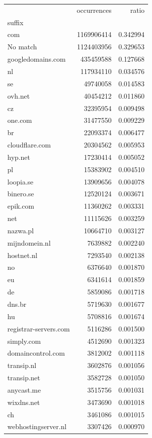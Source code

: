 \begin{tabular}{lrr}
\toprule
 & occurrences & ratio \\
suffix &  &  \\
\midrule
com & 1169906414 & 0.342994 \\
No match & 1124403956 & 0.329653 \\
googledomains.com & 435459588 & 0.127668 \\
nl & 117934110 & 0.034576 \\
se & 49740058 & 0.014583 \\
ovh.net & 40454212 & 0.011860 \\
cz & 32395954 & 0.009498 \\
one.com & 31477550 & 0.009229 \\
br & 22093374 & 0.006477 \\
cloudflare.com & 20304562 & 0.005953 \\
hyp.net & 17230414 & 0.005052 \\
pl & 15383902 & 0.004510 \\
loopia.se & 13909656 & 0.004078 \\
binero.se & 12520124 & 0.003671 \\
epik.com & 11360262 & 0.003331 \\
net & 11115626 & 0.003259 \\
nazwa.pl & 10664710 & 0.003127 \\
mijndomein.nl & 7639882 & 0.002240 \\
hostnet.nl & 7293540 & 0.002138 \\
no & 6376640 & 0.001870 \\
eu & 6341614 & 0.001859 \\
de & 5859086 & 0.001718 \\
dns.br & 5719630 & 0.001677 \\
hu & 5708816 & 0.001674 \\
registrar-servers.com & 5116286 & 0.001500 \\
simply.com & 4512690 & 0.001323 \\
domaincontrol.com & 3812002 & 0.001118 \\
transip.nl & 3602876 & 0.001056 \\
transip.net & 3582728 & 0.001050 \\
anycast.me & 3515756 & 0.001031 \\
wixdns.net & 3473690 & 0.001018 \\
ch & 3461086 & 0.001015 \\
webhostingserver.nl & 3307426 & 0.000970 \\

\end{tabular}
